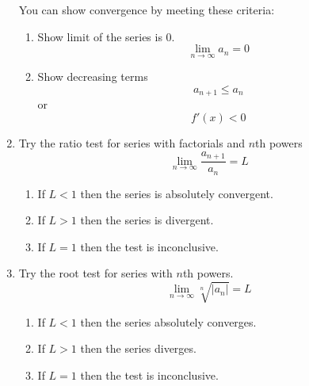 \documentclass{report}
\begin{document}
\begin{enumerate}
        You can show convergence by meeting these criteria:
        \begin{enumerate}
            \item Show limit of the series is 0. \[\lim_{n \to \infty} a_n = 0\]
            \item Show decreasing terms \[a_{n+1} \leq a_n \] or \[f'(x) < 0\]
        \end{enumerate}
        \item Try the ratio test for series with factorials and \(n\)th powers
        \[\lim_{n \to \infty} \frac{a_{n+1}}{a_n} = L \]
        \begin{enumerate}
            \item If \(L < 1\) then the series is absolutely convergent.
            \item If \(L > 1\) then the series is divergent.
            \item If \(L = 1\) then the test is inconclusive.
        \end{enumerate}
        \item Try the root test for series with \(n\)th powers. 
        \[\lim_{n \to \infty} \sqrt[n]{\left| a_n \right|} = L\] 
        \begin{enumerate}
            \item If \(L < 1\) then the series absolutely converges.
            \item If \(L > 1\) then the series diverges.
            \item If \(L = 1\) then the test is inconclusive.
        \end{enumerate}
    \end{enumerate}
    
\end{document}
